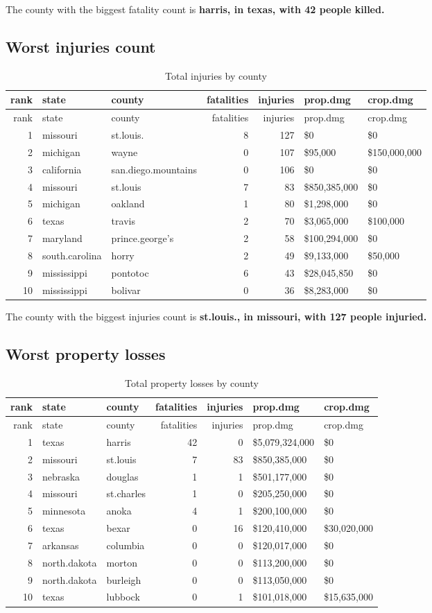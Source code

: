 \documentclass[]{article}
\begin{document}
The county with the biggest fatality count is \textbf{harris, in texas,
with 42 people killed.}

\subsection{Worst injuries count}\label{worst-injuries-count}

\begin{longtable}[]{@{}rllrrll@{}}
\caption{Total injuries by county}\tabularnewline
\toprule
rank & state & county & fatalities & injuries & prop.dmg &
crop.dmg\tabularnewline
\midrule
\endfirsthead
\toprule
rank & state & county & fatalities & injuries & prop.dmg &
crop.dmg\tabularnewline
\midrule
\endhead
1 & missouri & st.louis. & 8 & 127 & \$0 & \$0\tabularnewline
2 & michigan & wayne & 0 & 107 & \$95,000 & \$150,000,000\tabularnewline
3 & california & san.diego.mountains & 0 & 106 & \$0 &
\$0\tabularnewline
4 & missouri & st.louis & 7 & 83 & \$850,385,000 & \$0\tabularnewline
5 & michigan & oakland & 1 & 80 & \$1,298,000 & \$0\tabularnewline
6 & texas & travis & 2 & 70 & \$3,065,000 & \$100,000\tabularnewline
7 & maryland & prince.george's & 2 & 58 & \$100,294,000 &
\$0\tabularnewline
8 & south.carolina & horry & 2 & 49 & \$9,133,000 &
\$50,000\tabularnewline
9 & mississippi & pontotoc & 6 & 43 & \$28,045,850 & \$0\tabularnewline
10 & mississippi & bolivar & 0 & 36 & \$8,283,000 & \$0\tabularnewline
\bottomrule
\end{longtable}

The county with the biggest injuries count is \textbf{st.louis., in
missouri, with 127 people injuried.}

\subsection{Worst property losses}\label{worst-property-losses}

\begin{longtable}[]{@{}rllrrll@{}}
\caption{Total property losses by county}\tabularnewline
\toprule
rank & state & county & fatalities & injuries & prop.dmg &
crop.dmg\tabularnewline
\midrule
\endfirsthead
\toprule
rank & state & county & fatalities & injuries & prop.dmg &
crop.dmg\tabularnewline
\midrule
\endhead
1 & texas & harris & 42 & 0 & \$5,079,324,000 & \$0\tabularnewline
2 & missouri & st.louis & 7 & 83 & \$850,385,000 & \$0\tabularnewline
3 & nebraska & douglas & 1 & 1 & \$501,177,000 & \$0\tabularnewline
4 & missouri & st.charles & 1 & 0 & \$205,250,000 & \$0\tabularnewline
5 & minnesota & anoka & 4 & 1 & \$200,100,000 & \$0\tabularnewline
6 & texas & bexar & 0 & 16 & \$120,410,000 & \$30,020,000\tabularnewline
7 & arkansas & columbia & 0 & 0 & \$120,017,000 & \$0\tabularnewline
8 & north.dakota & morton & 0 & 0 & \$113,200,000 & \$0\tabularnewline
9 & north.dakota & burleigh & 0 & 0 & \$113,050,000 & \$0\tabularnewline
10 & texas & lubbock & 0 & 1 & \$101,018,000 &
\$15,635,000\tabularnewline
\bottomrule
\end{longtable}
\end{document}
